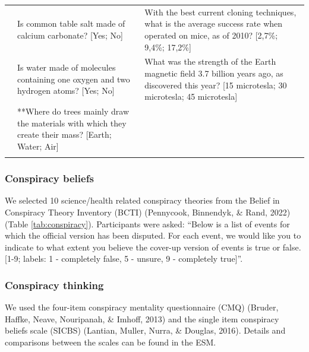 \documentclass[
  doc,floatsintext]{apa6}
\begin{document}
\begin{longtable}[t]{>{\raggedleft\arraybackslash}p{2em}>{\raggedright\arraybackslash}p{22em}>{\raggedright\arraybackslash}p{22em}}
9 & Is common table salt made of calcium carbonate? [Yes; No] & With the best current cloning techniques, what is the average success rate when operated on mice, as of 2010? [2,7\%; 9,4\%; 17,2\%]\\
10 & Is water made of molecules containing one oxygen and two hydrogen atoms? [Yes; No] & What was the strength of the Earth magnetic field 3.7 billion years ago, as discovered this year? [15 microtesla; 30 microtesla; 45 microtesla]\\
\addlinespace
11 & **Where do trees mainly draw the materials with which they create their mass? [Earth; Water; Air] & \\
\bottomrule
\multicolumn{3}{l}{\rule{0pt}{1em}\textsuperscript{*} Only used in Study 1}\\
\end{longtable}
\endgroup{}

\subsubsection{Conspiracy beliefs}\label{conspiracy-beliefs}

We selected 10 science/health related conspiracy theories from the Belief in Conspiracy Theory Inventory (BCTI) (Pennycook, Binnendyk, \& Rand, 2022) (Table \ref{tab:conspiracy}). Participants were asked: ``Below is a list of events for which the official version has been disputed. For each event, we would like you to indicate to what extent you believe the cover-up version of events is true or false. {[}1-9; labels: 1 - completely false, 5 - unsure, 9 - completely true{]}''.

\subsubsection{Conspiracy thinking}\label{conspiracy-thinking}

We used the four-item conspiracy mentality questionnaire (CMQ) (Bruder, Haffke, Neave, Nouripanah, \& Imhoff, 2013) and the single item conspiracy beliefs scale (SICBS) (Lantian, Muller, Nurra, \& Douglas, 2016). Details and comparisons between the scales can be found in the ESM.

\begingroup\fontsize{8}{10}\selectfont
\end{document}
